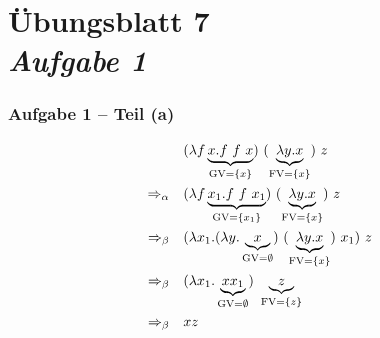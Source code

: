 \documentclass{beamer}
\DeclareMathOperator{\GV}{GV}
\DeclareMathOperator{\FV}{FV}
\begin{document}
\section{Übungsblatt 7 \\ \textit{\normalsize Aufgabe 1}}


\begin{frame} \frametitle{Aufgabe 1 -- Teil (a)}
	\begin{align*}
		&(\lambda f \underbrace{x . f \ f \ x}_{\GV = \menge{x}}) \ (\underbrace{\lambda y . x}_{\FV = \menge{x}}) \ z	\\
		\Rightarrow_\alpha \quad
		& (\lambda f \underbrace{x_1 . f \ f \ x_1}_{\GV = \menge{x_1}}) \ (\underbrace{\lambda y . x}_{\FV = \menge{x}}) \ z
		\\
		\Rightarrow_\beta \quad
		& (\lambda x_1 . (\lambda y . \underbrace{x}_{\GV = \emptyset}) \ (\underbrace{\lambda y . x}_{\FV = \menge{x}}) \ x_1) \ z
		\\
		\Rightarrow_\beta \quad
		& (\lambda x_1 . \underbrace{x x_1}_{\GV = \emptyset}) \ \underbrace{z}_{\FV = \menge{z}}
		\\
		\Rightarrow_\beta \quad
		& xz
		\\
	\end{align*}
\end{frame}
\end{document}
